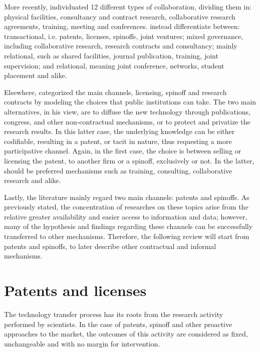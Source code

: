 More recently, \citet{Muscio2013} individuated 12 different types of collaboration, dividing them in: physical facilities, consultancy and contract research, collaborative research agreements, training, meeting and conferences. \citet{Alexander2013} instead differentiate between: transactional, i.e. patents, licenses, spinoffs, joint ventures; mixed governance, including collaborative research, research contracts and consultancy; mainly relational, such as shared facilities, journal publication, training, joint supervision; and relational, meaning joint conference, networks, student placement and alike.

Elsewhere, \citet{Balderi2010} categorized the main channels, licensing, spinoff and research contracts by modeling the choices that public institutions can take. The two main alternatives, in his view, are to diffuse the new technology through publications, congress, and other non-contractual mechanisms, or to protect and privatize the research results. In this latter case, the underlying knowledge can be either codifiable, resulting in a patent, or tacit in nature, thus requesting a more participative channel. Again, in the first case, the choice is between selling or licensing the patent, to another firm or a spinoff, exclusively or not. In the latter, should be preferred mechanisms such as training, consulting, collaborative research and alike. 

Lastly, the literature mainly regard two main channels: patents and spinoffs. As previously stated, the concentration of researches on these topics arise from the relative greater availability and easier access to information and data; however, many of the hypothesis and findings regarding these channels can be successfully transferred to other mechanisms. Therefore, the following review will start from patents and spinoffs, to later describe other contractual and informal mechanisms. 

\section{Patents and licenses}

The technology transfer process has its roots from the research activity performed by scientists. In the case of patents, spinoff and other proactive approaches to the market, the outcomes of this activity are considered as fixed, unchangeable and with no margin for intervention. 

